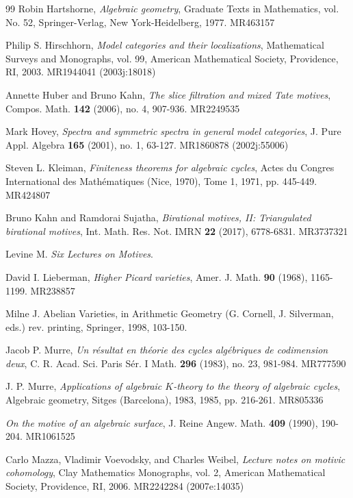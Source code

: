 \documentclass[10pt]{amsart}
\theoremstyle{definition}
\theoremstyle{remark}
\theoremstyle{definition}
\begin{document}
\begin{thebibliography}{99}
 Robin Hartshorne, \textit{Algebraic geometry}, Graduate Texts in Mathematics, vol. No. 52, Springer-Verlag, New York-Heidelberg, 1977. MR463157

 Philip S. Hirschhorn, \textit{Model categories and their localizations}, Mathematical Surveys and Monographs, vol. 99, American Mathematical Society, Providence, RI, 2003. MR1944041 (2003j:18018)

 Annette Huber and Bruno Kahn, \textit{The slice filtration and mixed Tate motives}, Compos. Math. \textbf{142} (2006), no. 4, 907-936. MR2249535

 Mark Hovey, \textit{Spectra and symmetric spectra in general model categories}, J. Pure Appl. Algebra \textbf{165} (2001), no. 1, 63-127. MR1860878 (2002j:55006)

 Steven L. Kleiman, \textit{Finiteness theorems for algebraic cycles}, Actes du Congres International des Math\'ematiques (Nice, 1970), Tome 1, 1971, pp. 445-449. MR424807

 Bruno Kahn and Ramdorai Sujatha, \textit{Birational motives, II: Triangulated birational motives}, Int. Math. Res. Not. IMRN \textbf{22} (2017), 6778-6831. MR3737321


 Levine M. \textit{Six Lectures on Motives}.

 David I. Lieberman, \textit{Higher Picard varieties}, Amer. J. Math. \textbf{90} (1968), 1165-1199. MR238857

 Milne J. Abelian Varieties, in Arithmetic Geometry (G. Cornell, J. Silverman, eds.) rev. printing, Springer, 1998, 103-150.

 Jacob P. Murre, \textit{Un r\'esultat en th\'eorie des cycles alg\'ebriques de codimension deux}, C. R. Acad. Sci. Paris S\'er. I Math. \textbf{296} (1983), no. 23, 981-984. MR777590

 J. P. Murre, \textit{Applications of algebraic $K$-theory to the theory of algebraic cycles}, Algebraic geometry, Sitges (Barcelona), 1983, 1985, pp. 216-261. MR805336

 \textit{On the motive of an algebraic surface}, J. Reine Angew. Math. \textbf{409} (1990), 190-204. MR1061525

 Carlo Mazza, Vladimir Voevodsky, and Charles Weibel, \textit{Lecture notes on motivic cohomology}, Clay Mathematics Monographs, vol. 2, American Mathematical Society, Providence, RI, 2006. MR2242284 (2007e:14035)


\end{thebibliography}
\end{document}
